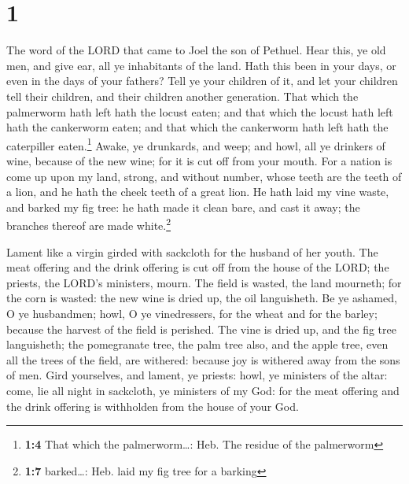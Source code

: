 \hypertarget{section}{%
\section{1}\label{section}}

 The word of the LORD that came to Joel the son of
Pethuel.  Hear this, ye old men, and give ear, all ye
inhabitants of the land. Hath this been in your days, or even in the
days of your fathers?  Tell ye your children of it, and
let your children tell their children, and their children another
generation.  That which the palmerworm hath left hath the
locust eaten; and that which the locust hath left hath the cankerworm
eaten; and that which the cankerworm hath left hath the caterpiller
eaten.\footnote{\textbf{1:4} That which the palmerworm\ldots: Heb. The
  residue of the palmerworm}  Awake, ye drunkards, and
weep; and howl, all ye drinkers of wine, because of the new wine; for it
is cut off from your mouth.  For a nation is come up upon
my land, strong, and without number, whose teeth are the teeth of a
lion, and he hath the cheek teeth of a great lion.  He
hath laid my vine waste, and barked my fig tree: he hath made it clean
bare, and cast it away; the branches thereof are made white.\footnote{\textbf{1:7}
  barked\ldots: Heb. laid my fig tree for a barking}

 Lament like a virgin girded with sackcloth for the
husband of her youth.  The meat offering and the drink
offering is cut off from the house of the LORD; the priests, the LORD's
ministers, mourn.  The field is wasted, the land
mourneth; for the corn is wasted: the new wine is dried up, the oil
languisheth.  Be ye ashamed, O ye husbandmen; howl, O ye
vinedressers, for the wheat and for the barley; because the harvest of
the field is perished.  The vine is dried up, and the fig
tree languisheth; the pomegranate tree, the palm tree also, and the
apple tree, even all the trees of the field, are withered: because joy
is withered away from the sons of men.  Gird yourselves,
and lament, ye priests: howl, ye ministers of the altar: come, lie all
night in sackcloth, ye ministers of my God: for the meat offering and
the drink offering is withholden from the house of your God.

